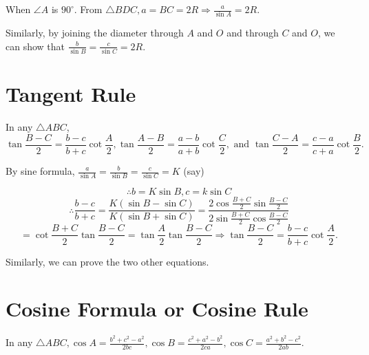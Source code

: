  When $\angle A$ is $90^\circ$.
From $\triangle BDC, a = BC = 2R \Rightarrow \frac{a}{\sin A} = 2R$.

\noindent Similarly, by joining the diameter through $A$ and $O$ and through $C$ and $O$, we can show that $\frac{b}{\sin B} =
\frac{c}{\sin C} = 2R$.

\stopproof

\section{Tangent Rule}
\starttheorem
  In any $\triangle ABC$,
  $$\tan\frac{B - C}{2} = \frac{b - c}{b + c}\cot\frac{A}{2}, \tan\frac{A - B}{2} = \frac{a - b}{a + b}\cot\frac{C}{2},
  \text{~and~}\tan\frac{C - A}{2} = \frac{c - a}{c + a}\cot\frac{B}{2}.$$
\stoptheorem

\startproof
  By sine formula, $\frac{a}{\sin A} = \frac{b}{\sin B} = \frac{c}{\sin C} = K$ (say)

  $$\therefore b = K\sin B, c = k\sin C$$
  $$\therefore \frac{b - c}{b + c} = \frac{K(\sin B - \sin C)}{K(\sin B + \sin C)} = \frac{2\cos\frac{B + C}{2}\sin\frac{B -
      C}{2}}{2\sin\frac{B + C}{2}\cos\frac{B - C}{2}}$$
  $$=\cot\frac{B + C}{2}\tan\frac{B - C}{2} = \tan\frac{A}{2}\tan\frac{B - C}{2} \Rightarrow \tan\frac{B - C}{2} = \frac{b - c}{b +
    c}\cot\frac{A}{2}.$$
\stopproof

Similarly, we can prove the two other equations.

\section{Cosine Formula or Cosine Rule}
\starttheorem
  In any $\triangle ABC, \cos A = \frac{b^2 + c^2 - a^2}{2bc}, \cos B = \frac{c^2 + a^2 - b^2}{2ca}, \cos C = \frac{a^2 + b^2 - c^2}{2ab}.$
\stoptheorem

